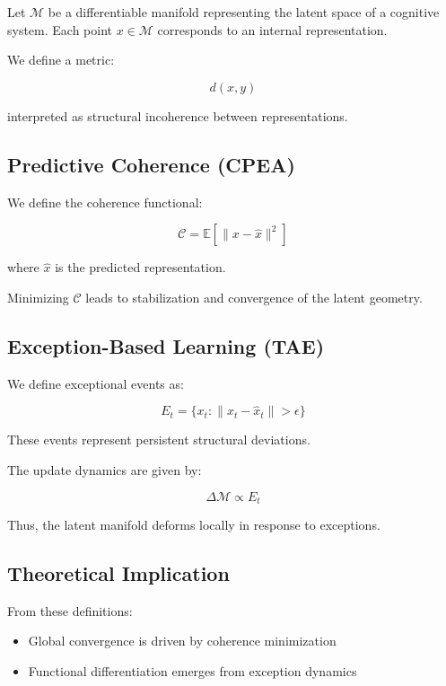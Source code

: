 \documentclass[11pt]{article}
\begin{document}
Let $\mathcal{M}$ be a differentiable manifold representing the latent space of a cognitive system. Each point $x \in \mathcal{M}$ corresponds to an internal representation.

We define a metric:

\begin{equation}
d(x, y)
\end{equation}

interpreted as structural incoherence between representations.

\subsection{Predictive Coherence (CPEA)}

We define the coherence functional:

\begin{equation}
\mathcal{C} = \mathbb{E}[\|x - \hat{x}\|^2]
\end{equation}

where $\hat{x}$ is the predicted representation.

Minimizing $\mathcal{C}$ leads to stabilization and convergence of the latent geometry.

\subsection{Exception-Based Learning (TAE)}

We define exceptional events as:

\begin{equation}
E_t = \{x_t : \|x_t - \hat{x}_t\| > \epsilon\}
\end{equation}

These events represent persistent structural deviations.

The update dynamics are given by:

\begin{equation}
\Delta \mathcal{M} \propto E_t
\end{equation}

Thus, the latent manifold deforms locally in response to exceptions.

\subsection{Theoretical Implication}

From these definitions:

\begin{itemize}
    \item Global convergence is driven by coherence minimization
    \item Functional differentiation emerges from exception dynamics
\end{itemize}
\end{document}
